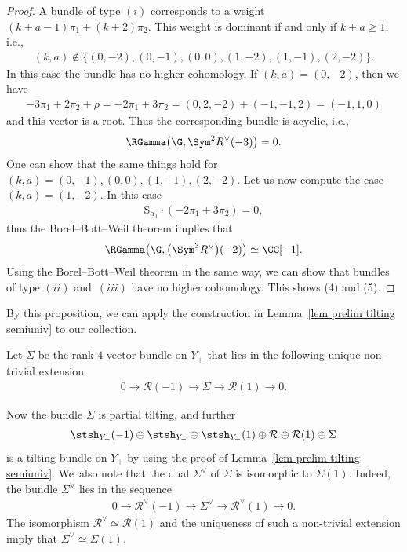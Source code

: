 \begin{proof}
A bundle of type $(i)$ corresponds to a weight $(k+a-1)\pi_1 + (k+2)\pi_2$.
This weight is dominant if and only if $k+a \geq 1$, i.e.,
\begin{gather*}
(k, a) \notin \{ (0, -2), (0, -1), (0, 0), (1, -2), (1, -1), (2, -2) \}.
\end{gather*}
In this case the bundle has no higher cohomology.
If $(k,a) = (0, -2)$, then we have
\begin{gather*}
-3 \pi_1 + 2 \pi_2 + \rho = -2\pi_1 + 3\pi_2 = (0,2,-2) + (-1,-1,2) = (-1,1,0)
\end{gather*}
and this vector is a root.
Thus the corresponding bundle is acyclic, i.e.,
\begin{gather*}
\RGamma\big(\G, \Sym^2 R^{\vee}(-3)\big) = 0.
\end{gather*}
One can show that the same things hold for $(k,a) = (0,-1), (0,0), (1,-1), (2,-2)$.
Let us now compute the case $(k,a) = (1,-2)$.
In this case
\begin{gather*}
\mathrm{S}_{\alpha_1} \cdot (-2 \pi_1 + 3 \pi_2) = 0,
\end{gather*}
thus the Borel--Bott--Weil theorem implies that
\begin{gather*}
\RGamma\big(\G, \big(\Sym^3 R^{\vee}\big)(-2)\big) \simeq \CC[-1].
\end{gather*}
Using the Borel--Bott--Weil theorem in the same way, we can show that bundles of type $(ii)$ and~$(iii)$ have no higher cohomology.
This shows (4) and (5).
\end{proof}

By this proposition, we can apply the construction in Lemma~\ref{lem prelim tilting semiuniv} to our collection.

\begin{Definition} \rm
Let $\Sigma$ be the rank $4$ vector bundle on $Y_+$ that lies in the following unique non-trivial extension
\begin{gather*}
0 \to \mathcal{R}(-1) \to \Sigma \to \mathcal{R}(1) \to 0.
\end{gather*}
\end{Definition}

Now the bundle $\Sigma$ is partial tilting, and further
\begin{gather*}
\stsh_{Y_+}(-1) \oplus \stsh_{Y_+} \oplus \stsh_{Y_+}(1) \oplus \mathcal{R} \oplus \mathcal{R}(1) \oplus \Sigma
\end{gather*}
is a tilting bundle on $Y_+$
by using the proof of Lemma~\ref{lem prelim tilting semiuniv}.
We~also note that the dual $\Sigma^{\vee}$ of $\Sigma$ is isomorphic to $\Sigma(1)$.
Indeed, the bundle $\Sigma^{\vee}$ lies in the sequence
\begin{gather*}
0 \to \mathcal{R}^{\vee}(-1) \to \Sigma^{\vee} \to \mathcal{R}^{\vee}(1) \to 0.
\end{gather*}
The isomorphism $\mathcal{R}^{\vee} \simeq \mathcal{R}(1)$ and the uniqueness of such a non-trivial extension imply that
$\Sigma^{\vee} \simeq \Sigma(1)$.

